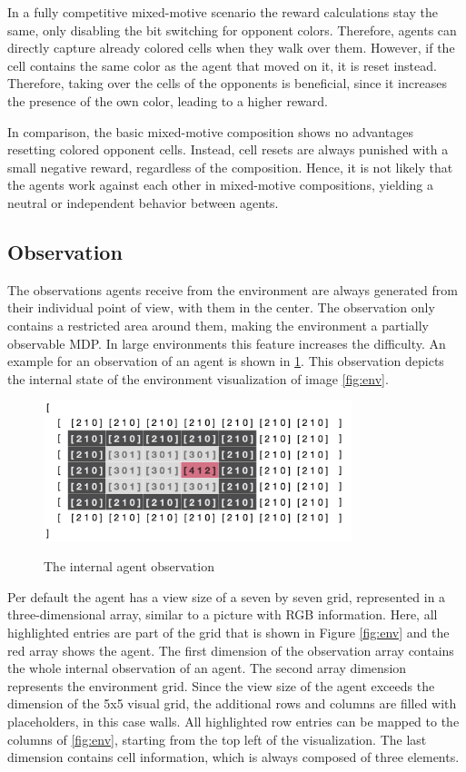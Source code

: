 In a fully competitive mixed-motive scenario the reward calculations stay the same, only disabling the bit switching for opponent colors. Therefore, agents can directly capture already colored cells when they walk over them. However, if the cell contains the same color as the agent that moved on it, it is reset instead. Therefore, taking over the cells of the opponents is beneficial, since it increases the presence of the own color, leading to a higher reward.

In comparison, the basic mixed-motive composition shows no advantages resetting colored opponent cells. Instead, cell resets are always punished with a small negative reward, regardless of the composition. Hence, it is not likely that the agents work against each other in mixed-motive compositions, yielding a neutral or independent behavior between agents.

\subsection{Observation}
The observations agents receive from the environment are always generated from their individual point of view, with them in the center. The observation only contains a restricted area around them, making the environment a partially observable MDP. In large environments this feature increases the difficulty.
An example for an observation of an agent is shown in \ref{fig:agent_obs}. This observation depicts the internal state of the environment visualization of image \ref{fig:env}.

\begin{figure}[hpbt]
    \centering
    \includegraphics[width=0.8\textwidth]{pictures/agent_observation}\\
    \caption[Agent Observation]{The internal agent observation}\label{fig:agent_obs}
\end{figure}

Per default the agent has a view size of a seven by seven grid, represented in a three-dimensional array, similar to a picture with RGB information. Here, all highlighted entries are part of the grid that is shown in Figure \ref{fig:env} and the red array shows the agent. The first dimension of the observation array contains the whole internal observation of an agent. The second array dimension represents the environment grid. Since the view size of the agent exceeds the dimension of the 5x5 visual grid, the additional rows and columns are filled with placeholders, in this case walls. All highlighted row entries can be mapped to the columns of \ref{fig:env}, starting from the top left of the visualization. The last dimension contains cell information, which is always composed of three elements. 

